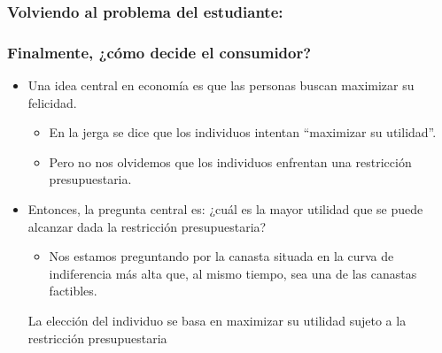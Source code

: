\documentclass{beamer}
\begin{document}
\begin{frame}
\frametitle{Volviendo al problema del estudiante:}
\begin{center}
\end{center}
\end{frame}

\begin{frame}
\frametitle{Finalmente, ¿cómo decide el consumidor?}
\begin{itemize}
    \item Una idea central en economía es que las personas buscan maximizar su felicidad. \vspace{2mm}
    \begin{itemize}
    \item En la jerga se dice que los individuos intentan ``maximizar su utilidad''. \vspace{2mm}
    \item Pero no nos olvidemos que los individuos enfrentan una restricción presupuestaria. \vspace{2mm}
    \end{itemize} 
    \item Entonces, la pregunta central es: ¿cuál es la mayor utilidad que se puede alcanzar dada la restricción presupuestaria? \vspace{2mm}
    \begin{itemize}
    \item Nos estamos preguntando por la canasta situada en la curva de indiferencia más alta que, al mismo tiempo, sea una de las canastas factibles. 
    \vspace{2mm}
    \end{itemize} 
    \begin{boxB}
    \centering La elección del individuo se basa en maximizar su utilidad sujeto a la restricción presupuestaria
    \end{boxB}
    \end{itemize}
\end{frame}
\end{document}
